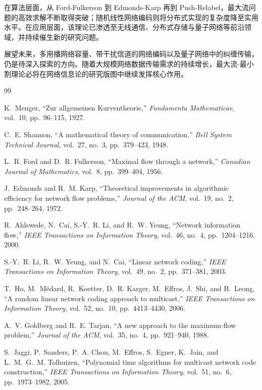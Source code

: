 \documentclass[12pt, a4paper]{article}
\begin{document}
在算法层面，从 Ford-Fulkerson 到 Edmonds-Karp 再到 Push-Relabel，最大流问题的高效求解不断取得突破；随机线性网络编码则将分布式实现的复杂度降至实用水平。在应用层面，该理论已渗透至无线通信、分布式存储与量子网络等前沿领域，并持续催生新的研究问题。

展望未来，多用播网络容量、带干扰信道的网络编码以及量子网络中的纠缠传输，仍是待深入探索的方向。随着大规模网络数据传输需求的持续增长，最大流-最小割理论必将在网络信息论的研究版图中继续发挥核心作用。

\begin{thebibliography}{99}

K.~Menger,
``Zur allgemeinen Kurventheorie,''
\emph{Fundamenta Mathematicae}, vol.~10, pp.~96--115, 1927.

C.~E. Shannon,
``A mathematical theory of communication,''
\emph{Bell System Technical Journal}, vol.~27, no.~3, pp.~379--423, 1948.

L.~R. Ford and D.~R. Fulkerson,
``Maximal flow through a network,''
\emph{Canadian Journal of Mathematics}, vol.~8, pp.~399--404, 1956.

J.~Edmonds and R.~M. Karp,
``Theoretical improvements in algorithmic efficiency for network flow problems,''
\emph{Journal of the ACM}, vol.~19, no.~2, pp.~248--264, 1972.

R.~Ahlswede, N.~Cai, S.-Y.~R. Li, and R.~W. Yeung,
``Network information flow,''
\emph{IEEE Transactions on Information Theory}, vol.~46, no.~4, pp.~1204--1216, 2000.

S.-Y.~R. Li, R.~W. Yeung, and N.~Cai,
``Linear network coding,''
\emph{IEEE Transactions on Information Theory}, vol.~49, no.~2, pp.~371--381, 2003.

T.~Ho, M.~M\'{e}dard, R.~Koetter, D.~R. Karger, M.~Effros, J.~Shi, and B.~Leong,
``A random linear network coding approach to multicast,''
\emph{IEEE Transactions on Information Theory}, vol.~52, no.~10, pp.~4413--4430, 2006.

A.~V. Goldberg and R.~E. Tarjan,
``A new approach to the maximum-flow problem,''
\emph{Journal of the ACM}, vol.~35, no.~4, pp.~921--940, 1988.

S.~Jaggi, P.~Sanders, P.~A. Chou, M.~Effros, S.~Egner, K.~Jain, and L.~M.~G.~M. Tolhuizen,
``Polynomial time algorithms for multicast network code construction,''
\emph{IEEE Transactions on Information Theory}, vol.~51, no.~6, pp.~1973--1982, 2005.


\end{thebibliography}
\end{document}
